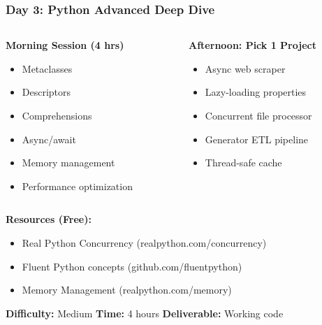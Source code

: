 \begin{frame}[fragile]\frametitle{Day 3: Python Advanced Deep Dive}
\begin{columns}
    \begin{column}[T]{0.5\linewidth}
      \textbf{Morning Session (4 hrs)}
      \begin{itemize}
        \item Metaclasses
        \item Descriptors
        \item Comprehensions
        \item Async/await
        \item Memory management
        \item Performance optimization
      \end{itemize}
    \end{column}
    \begin{column}[T]{0.5\linewidth}
      \textbf{Afternoon: Pick 1 Project}
      \begin{itemize}
        \item Async web scraper
        \item Lazy-loading properties
        \item Concurrent file processor
        \item Generator ETL pipeline
        \item Thread-safe cache
      \end{itemize}
    \end{column}
  \end{columns}
  
  \vspace{0.3cm}
  \textbf{Resources (Free):}
  \begin{itemize}
    \item Real Python Concurrency (realpython.com/concurrency)
    \item Fluent Python concepts (github.com/fluentpython)
    \item Memory Management (realpython.com/memory)
  \end{itemize}

\vspace{0.3cm}    
\textbf{Difficulty:} Medium \textbar \textbf{Time:} 4 hours \textbar \textbf{Deliverable:} Working code  
\end{frame}

